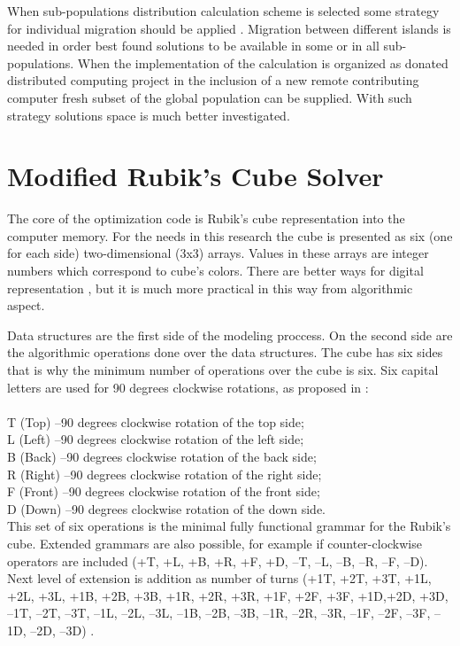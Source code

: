 \documentclass[runningheads]{llncs}
\begin{document}
When sub-populations distribution calculation scheme is selected some strategy for individual migration should be applied \cite{balabanov02}. Migration between different islands is needed in order best found solutions to be available in some or in all sub-populations. When the implementation of the calculation is organized as donated distributed computing project in the inclusion of a new remote contributing computer fresh subset of the global population can be supplied. With such strategy solutions space is much better investigated. 

\section{Modified Rubik's Cube Solver}

The core of the optimization code is Rubik's cube representation into the computer memory. For the needs in this research the cube is presented as six (one for each side) two-dimensional (3x3) arrays. Values in these arrays are integer numbers which correspond to cube's colors. There are better ways for digital representation \cite{korf01}, but it is much more practical in this way from algorithmic aspect. 

Data structures are the first side of the modeling proccess. On the second side are the algorithmic operations done over the data structures. The cube has six sides that is why the minimum number of operations over the cube is six. Six capital letters are used for 90 degrees clockwise rotations, as proposed in \cite{randall01,balabanov02}: \\ 
\\
T (Top) –90 degrees clockwise rotation of the top side; \\ 
L (Left) –90 degrees clockwise rotation of the left side; \\ 
B (Back) –90 degrees clockwise rotation of the back side; \\ 
R (Right) –90 degrees clockwise rotation of the right side; \\ 
F (Front) –90 degrees clockwise rotation of the front side; \\ 
D (Down) –90 degrees clockwise rotation of the down side. \\ 

This set of six operations is the minimal fully functional grammar for the Rubik's cube. Extended grammars are also possible, for example if counter-clockwise operators are included (+T, +L, +B, +R, +F, +D, –T, –L, –B, –R, –F, –D). Next level of extension is addition as number of turns (+1T, +2T, +3T, +1L, +2L, +3L, +1B, +2B, +3B, +1R, +2R, +3R, +1F, +2F, +3F, +1D,+2D, +3D, –1T, –2T, –3T, –1L, –2L, –3L, –1B, –2B, –3B, –1R, –2R, –3R, –1F, –2F, –3F, –1D, –2D, –3D) \cite{balabanov02}.
\end{document}
